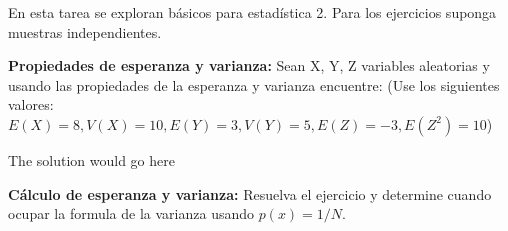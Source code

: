 \documentclass{oxmathproblems}
\begin{document}
En esta tarea se exploran básicos para estadística 2. Para los ejercicios suponga muestras independientes.

\begin{questions}

\miquestion \textbf{Propiedades de esperanza y varianza:}
Sean X, Y, Z variables aleatorias y usando las propiedades de la esperanza y varianza encuentre: (Use los siguientes valores: $E(X) = 8, V(X) = 10, E(Y) = 3, V(Y) = 5, E(Z) = -3, E(Z^2) = 10$)  

\begin{solution}
  The solution would go here
\end{solution}


\miquestion \textbf{Cálculo de esperanza y varianza:}
Resuelva el ejercicio y determine cuando ocupar la formula de la varianza usando $p(x) = 1/N$. 


\end{questions}
\end{document}
